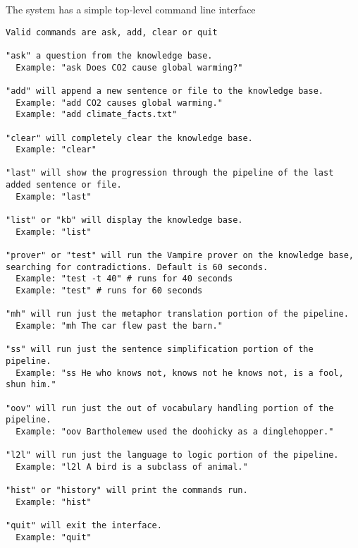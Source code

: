 \documentclass[letterpaper]{article}
\begin{document}
The system has a simple top-level command line interface

\begin{verbatim}
Valid commands are ask, add, clear or quit

"ask" a question from the knowledge base.
  Example: "ask Does CO2 cause global warming?"

"add" will append a new sentence or file to the knowledge base.
  Example: "add CO2 causes global warming."
  Example: "add climate_facts.txt"

"clear" will completely clear the knowledge base.
  Example: "clear"

"last" will show the progression through the pipeline of the last added sentence or file.
  Example: "last"

"list" or "kb" will display the knowledge base.
  Example: "list"

"prover" or "test" will run the Vampire prover on the knowledge base, searching for contradictions. Default is 60 seconds.
  Example: "test -t 40" # runs for 40 seconds
  Example: "test" # runs for 60 seconds

"mh" will run just the metaphor translation portion of the pipeline.
  Example: "mh The car flew past the barn."

"ss" will run just the sentence simplification portion of the pipeline.
  Example: "ss He who knows not, knows not he knows not, is a fool, shun him."

"oov" will run just the out of vocabulary handling portion of the pipeline.
  Example: "oov Bartholemew used the doohicky as a dinglehopper."

"l2l" will run just the language to logic portion of the pipeline.
  Example: "l2l A bird is a subclass of animal."

"hist" or "history" will print the commands run.
  Example: "hist"

"quit" will exit the interface.
  Example: "quit"
\end{verbatim}

\label{sect:bib}


\end{document}
